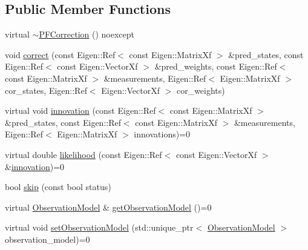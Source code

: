 \subsection*{Public Member Functions}
\begin{DoxyCompactItemize}
\item 
virtual \mbox{\hyperlink{classbfl_1_1PFCorrection_aa26f1c91715ebccc1d3c25f673d32279}{$\sim$\+P\+F\+Correction}} () noexcept
\item 
void \mbox{\hyperlink{classbfl_1_1PFCorrection_a7d8e7f910fe5ebcb7d8ed678c6f38836}{correct}} (const Eigen\+::\+Ref$<$ const Eigen\+::\+Matrix\+Xf $>$ \&pred\+\_\+states, const Eigen\+::\+Ref$<$ const Eigen\+::\+Vector\+Xf $>$ \&pred\+\_\+weights, const Eigen\+::\+Ref$<$ const Eigen\+::\+Matrix\+Xf $>$ \&measurements, Eigen\+::\+Ref$<$ Eigen\+::\+Matrix\+Xf $>$ cor\+\_\+states, Eigen\+::\+Ref$<$ Eigen\+::\+Vector\+Xf $>$ cor\+\_\+weights)
\item 
virtual void \mbox{\hyperlink{classbfl_1_1PFCorrection_a22e803c147f8fb45b7b98c854a947057}{innovation}} (const Eigen\+::\+Ref$<$ const Eigen\+::\+Matrix\+Xf $>$ \&pred\+\_\+states, const Eigen\+::\+Ref$<$ const Eigen\+::\+Matrix\+Xf $>$ \&measurements, Eigen\+::\+Ref$<$ Eigen\+::\+Matrix\+Xf $>$ innovations)=0
\item 
virtual double \mbox{\hyperlink{classbfl_1_1PFCorrection_a4310e630d4c269bd66557e44e5deecb0}{likelihood}} (const Eigen\+::\+Ref$<$ const Eigen\+::\+Vector\+Xf $>$ \&\mbox{\hyperlink{classbfl_1_1PFCorrection_a22e803c147f8fb45b7b98c854a947057}{innovation}})=0
\item 
bool \mbox{\hyperlink{classbfl_1_1PFCorrection_ab25e625ea12fe257e0eb85d465835e62}{skip}} (const bool status)
\item 
virtual \mbox{\hyperlink{classbfl_1_1ObservationModel}{Observation\+Model}} \& \mbox{\hyperlink{classbfl_1_1PFCorrection_a3bc4010f306825d69014bee53cd262ad}{get\+Observation\+Model}} ()=0
\item 
virtual void \mbox{\hyperlink{classbfl_1_1PFCorrection_a437fcf552a85f427d1369d8e43e56144}{set\+Observation\+Model}} (std\+::unique\+\_\+ptr$<$ \mbox{\hyperlink{classbfl_1_1ObservationModel}{Observation\+Model}} $>$ observation\+\_\+model)=0
\end{DoxyCompactItemize}
